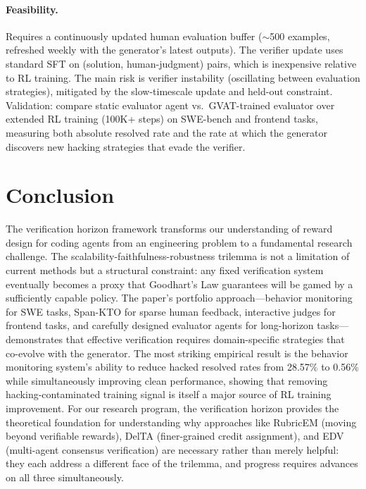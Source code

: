 \documentclass[11pt,a4paper]{article}
\begin{document}
\paragraph{Feasibility.} Requires a continuously updated human evaluation buffer ($\sim$500 examples, refreshed weekly with the generator's latest outputs). The verifier update uses standard SFT on (solution, human-judgment) pairs, which is inexpensive relative to RL training. The main risk is verifier instability (oscillating between evaluation strategies), mitigated by the slow-timescale update and held-out constraint. Validation: compare static evaluator agent vs.\ GVAT-trained evaluator over extended RL training (100K+ steps) on SWE-bench and frontend tasks, measuring both absolute resolved rate and the rate at which the generator discovers new hacking strategies that evade the verifier.

\section{Conclusion}

The verification horizon framework transforms our understanding of reward design for coding agents from an engineering problem to a fundamental research challenge. The scalability-faithfulness-robustness trilemma is not a limitation of current methods but a structural constraint: any fixed verification system eventually becomes a proxy that Goodhart's Law guarantees will be gamed by a sufficiently capable policy. The paper's portfolio approach---behavior monitoring for SWE tasks, Span-KTO for sparse human feedback, interactive judges for frontend tasks, and carefully designed evaluator agents for long-horizon tasks---demonstrates that effective verification requires domain-specific strategies that co-evolve with the generator. The most striking empirical result is the behavior monitoring system's ability to reduce hacked resolved rates from 28.57\% to 0.56\% while simultaneously improving clean performance, showing that removing hacking-contaminated training signal is itself a major source of RL training improvement. For our research program, the verification horizon provides the theoretical foundation for understanding why approaches like RubricEM (moving beyond verifiable rewards), DelTA (finer-grained credit assignment), and EDV (multi-agent consensus verification) are necessary rather than merely helpful: they each address a different face of the trilemma, and progress requires advances on all three simultaneously.
\end{document}
